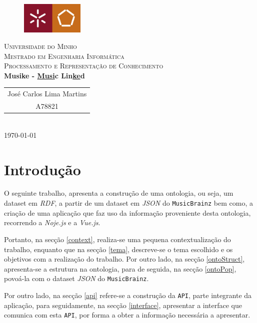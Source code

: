 \documentclass{article}
\begin{document}
{
\center
\begin{figure}[H]
        \centering
        \includegraphics[width=3cm]{Pictures/UM_EENG.jpg}
\end{figure}
\textsc{\Large Universidade do Minho} \\ [0.5cm]
\textsc{\Large Mestrado em Engenharia Informática} \\ [0.5cm]
\textsc{\large Processamento e Representação de Conhecimento} \\ [0.5cm]

{\LARGE \bfseries Musike - \underline{Musi}c Lin\underline{ke}d} \\[0.5cm]

\begin{tabular}{c} 
    José Carlos Lima Martins \\
    A78821 \\
\end{tabular} \\[0.5cm]

\today \\[1cm]
}

\section{Introdução}

O seguinte trabalho, apresenta a construção de uma ontologia, ou seja, um dataset em \textit{RDF}, a partir de um dataset em \textit{JSON} do \texttt{MusicBrainz} bem como, a criação de uma aplicação que faz uso da informação proveniente desta ontologia, recorrendo a \textit{Noje.js} e a \textit{Vue.js}.

Portanto, na secção \ref{context}, realiza-se uma pequena contextualização do trabalho, enquanto que na secção \ref{tema}, descreve-se o tema escolhido e os objetivos com a realização do trabalho. Por outro lado, na secção \ref{ontoStruct}, apresenta-se a estrutura na ontologia, para de seguida, na secção \ref{ontoPop}, povoá-la com o dataset \textit{JSON} do \texttt{MusicBrainz}.

Por outro lado, na secção \ref{api} refere-se a construção da \texttt{API}, parte integrante da aplicação, para seguidamente, na secção \ref{interface}, apresentar a interface que comunica com esta \texttt{API}, por forma a obter a informação necessária a apresentar. 
\end{document}

